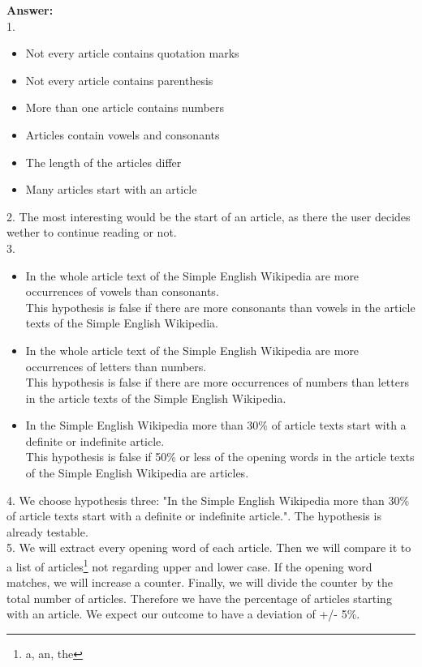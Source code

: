 \documentclass{WeSTassignment}
\begin{document}
\textbf{Answer:}
\\
1. 
\begin{itemize}
	\item Not every article contains quotation marks 
	\item Not every article contains parenthesis 
	\item More than one article contains numbers
	\item Articles contain vowels and consonants
	\item The length of the articles differ 
	\item Many articles start with an article
\end{itemize}
2.
The most interesting would be the start of an article, as there the user decides wether to continue reading or not.
\\3. 
\begin{itemize}
	\item In the whole article text of the Simple English Wikipedia are more occurrences of vowels than consonants. \\ This hypothesis is false if there are more consonants than vowels in the article texts of the Simple English Wikipedia.
	\item In the whole article text of the Simple English Wikipedia are more occurrences of letters than numbers. \\ This hypothesis is false if there are more occurrences of numbers than letters in the article texts of the Simple English Wikipedia.
	\item In the Simple English Wikipedia more than 30\% of article texts start with a definite or indefinite article. \\ This hypothesis is false if 50\% or less of the opening words in the article texts of the Simple English Wikipedia are articles. 
\end{itemize}
4. 
We choose hypothesis three: "In the Simple English Wikipedia more than 30\% of article texts start with a definite or indefinite article.". The hypothesis is already testable.\\
5.
We will extract every opening word of each article. Then we will compare it to a list of articles\footnote{a, an, the} not regarding upper and lower case. If the opening word matches, we will increase a counter. Finally, we will divide the counter by the total number of articles. Therefore we have the percentage of articles starting with an article. 
We expect our outcome to have a deviation of +/- 5\%.
\end{document}
